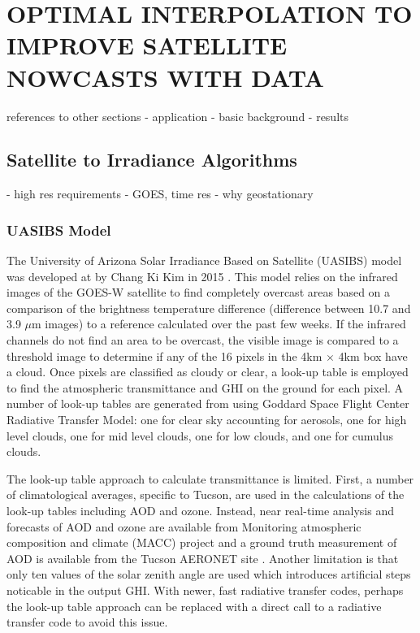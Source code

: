 \chapter{OPTIMAL INTERPOLATION TO IMPROVE SATELLITE NOWCASTS WITH DATA}
\label{chap:satoi}

references to other sections
- application
- basic background
- results

\section{Satellite to Irradiance Algorithms}
- high res requirements
- GOES, time res
- why geostationary

\subsection{UASIBS Model}
The University of Arizona Solar Irradiance Based on Satellite (UASIBS)
model was developed at by Chang Ki Kim in 2015 \citep{Kim2016}.
This model relies on the infrared images of the GOES-W satellite to
find completely overcast areas based on a comparison of the brightness
temperature difference (difference between 10.7 and 3.9 $\mu$m
images) to a reference calculated over the past few weeks.
If the infrared channels do not find an area to be overcast, the
visible image is compared to a threshold image to determine if any of
the 16 pixels in the 4km $\times$ 4km box have a cloud.
Once pixels are classified as cloudy or clear, a look-up table is
employed to find the atmospheric transmittance and GHI on the ground
for each pixel.
A number of look-up tables are generated from using Goddard Space
Flight Center Radiative Transfer Model: one for clear sky
accounting for aerosols, one for high level clouds, one for mid level
clouds, one for low clouds, and one for cumulus clouds.

The look-up table approach to calculate transmittance is limited.
First, a number of climatological averages, specific to Tucson, are
used in the calculations of the look-up tables including AOD and
ozone.
Instead, near real-time analysis and forecasts of AOD and ozone are
available from Monitoring atmospheric composition and climate (MACC)
project \citep{Morcrette2009} and a ground truth measurement of AOD is
available from the Tucson AERONET site \citep{Holben1998}.
Another limitation is that only ten values of the solar zenith angle
are used which introduces artificial steps noticable in the output
GHI.
With newer, fast radiative transfer codes, perhaps the look-up table
approach can be replaced with a direct call to a radiative transfer
code to avoid this issue.

